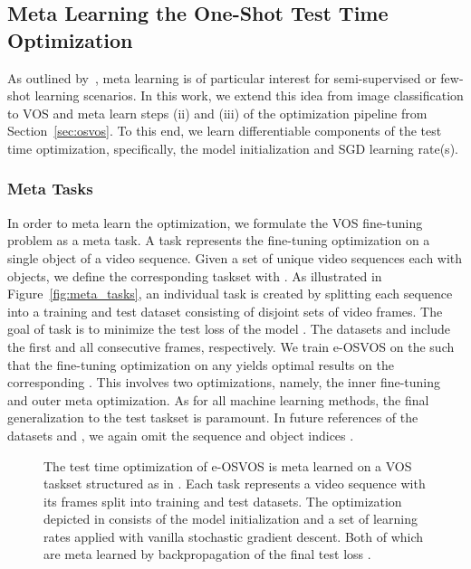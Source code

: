 \documentclass{article}
\begin{document}
\subsection{Meta Learning the One-Shot Test Time Optimization}

    As outlined by~\cite{Ravi2017OptimizationAA}, meta learning is of particular interest for semi-supervised or few-shot learning scenarios. In this work, we extend this idea from image classification to VOS and meta learn steps (ii) and (iii) of the optimization pipeline from Section~\ref{sec:osvos}.
To this end, we learn differentiable components of the test time optimization, specifically, the model initialization and SGD learning rate(s).


    \subsubsection{Meta Tasks}
In order to meta learn the optimization, we formulate the VOS fine-tuning problem as a meta task.
A task represents the fine-tuning optimization on a single object of a video sequence.
Given a set of  unique video sequences each with  objects, we define the corresponding taskset  with .
As illustrated in Figure~\ref{fig:meta_tasks}, an individual task is created by splitting each sequence into a training and test dataset consisting of disjoint sets of video frames.
The goal of task  is to minimize the test loss  of the model .
The datasets  and  include the first and all consecutive frames, respectively.
We train e-OSVOS on the
          such that the fine-tuning optimization on any  yields optimal results on the corresponding .
This involves two optimizations, namely, the inner fine-tuning and outer meta optimization.
As for all machine learning methods, the final generalization to the test taskset  is paramount.
In future references of the datasets  and , we again omit the sequence and object indices .

        \begin{figure*}[ht]
    \centering
    \hspace*{-0.22cm}
\caption{The test time optimization  of e-OSVOS is meta learned on a VOS taskset structured as in \protect{}.
Each task represents a video sequence with its frames split into training  and test  datasets.
The optimization  depicted in \protect{} consists of the model initialization and a set of learning rates applied with vanilla stochastic gradient descent.
Both of which are meta learned by backpropagation of the final test loss .
}
\end{figure*} 
\end{document}
